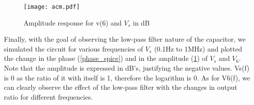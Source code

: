 \begin{figure}[h] \centering
  \texttt{[image: acm.pdf]}
  \caption{Amplitude response for v(6) and $V_s$ in dB}
  \label{amp_spice}
\end{figure}


Finally, with the goal of observing the low-pass filter nature 
of the capacitor, we simulated the circuit for various frequencies of 
$V_s$ (0.1Hz to 1MHz) and plotted the change in the phase (\ref{phase_spice}) 
and in the amplitude (\ref{amp_spice}) of $V_s$ and $V_6$. Note that the 
amplitude is expressed in dB's, justifying the negative values. Vs(f) is 0 as the ratio of it with itself is 1, therefore the logarithm is 0. As for V6(f), we can clearly observe the effect of the low-pass filter with the changes in output ratio for different frequencies.











